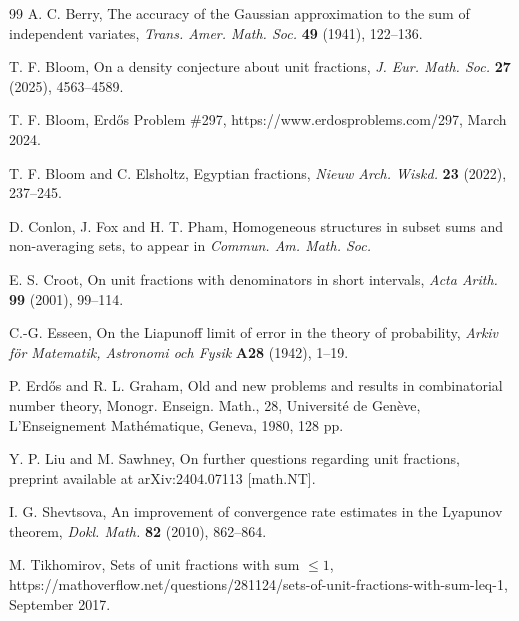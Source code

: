 \documentclass{daj}
\begin{document}

\begin{thebibliography}{99}
 A. C. Berry, The accuracy of the Gaussian approximation to the sum of independent variates, {\it Trans. Amer. Math. Soc.} {\bf 49} (1941), 122--136.

    T. F. Bloom, On a density conjecture about unit fractions, {\it J. Eur. Math. Soc.} {\bf 27} (2025), 4563--4589.
    
     T. F. Bloom, Erd\H{o}s Problem \#297, https://www.erdosproblems.com/297, March 2024.
    
    T. F. Bloom and C. Elsholtz, Egyptian fractions, {\it Nieuw Arch. Wiskd.} {\bf 23} (2022), 237--245.

     D. Conlon, J. Fox and H. T. Pham, Homogeneous structures in subset sums and non-averaging sets, to appear in {\it Commun. Am. Math. Soc.}

     E. S. Croot, On unit fractions with denominators in short intervals, {\it Acta Arith.} {\bf 99} (2001), 99--114.

     C.-G. Esseen, On the Liapunoff limit of error in the theory of probability, {\it Arkiv för Matematik, Astronomi och Fysik} {\bf A28} (1942), 1--19. 

      P. Erd\H{o}s and R. L. Graham, Old and new problems and results in combinatorial number theory, Monogr. Enseign. Math., 28, Universit\'e de Gen\`eve, L'Enseignement Math\'ematique, Geneva, 1980, 128 pp.

    Y. P. Liu and M. Sawhney, On further questions regarding unit fractions, preprint available at arXiv:2404.07113 [math.NT].
    
     I. G. Shevtsova, An improvement of convergence rate estimates in the Lyapunov theorem, {\it Dokl. Math.} {\bf 82} (2010), 862--864.

    
    M. Tikhomirov, Sets of unit fractions with sum $\le 1$, https://mathoverflow.net/questions/281124/sets-of-unit-fractions-with-sum-leq-1, September 2017.
    


\end{thebibliography}
\end{document}

